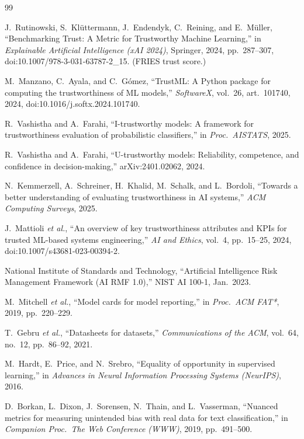 \renewcommand{\bibname}{References}
\begin{thebibliography}{99}
\small\setlength{\itemsep}{0pt}\setlength{\parskip}{0pt}

 J.~Rutinowski, S.~Kl\"uttermann, J.~Endendyk, C.~Reining, and E.~M\"uller, ``Benchmarking Trust: A Metric for Trustworthy Machine Learning,'' in \emph{Explainable Artificial Intelligence (xAI 2024)}, Springer, 2024, pp.~287--307, doi:10.1007/978-3-031-63787-2\_15. (FRIES trust score.)

 M.~Manzano, C.~Ayala, and C.~G\'omez, ``TrustML: A Python package for computing the trustworthiness of ML models,'' \emph{SoftwareX}, vol.~26, art.~101740, 2024, doi:10.1016/j.softx.2024.101740.

 R.~Vashistha and A.~Farahi, ``I-trustworthy models: A framework for trustworthiness evaluation of probabilistic classifiers,'' in \emph{Proc.\ AISTATS}, 2025.

 R.~Vashistha and A.~Farahi, ``U-trustworthy models: Reliability, competence, and confidence in decision-making,'' arXiv:2401.02062, 2024.

 N.~Kemmerzell, A.~Schreiner, H.~Khalid, M.~Schalk, and L.~Bordoli, ``Towards a better understanding of evaluating trustworthiness in AI systems,'' \emph{ACM Computing Surveys}, 2025.

 J.~Mattioli \emph{et al.}, ``An overview of key trustworthiness attributes and KPIs for trusted ML-based systems engineering,'' \emph{AI and Ethics}, vol.~4, pp.~15--25, 2024, doi:10.1007/s43681-023-00394-2.

 National Institute of Standards and Technology, ``Artificial Intelligence Risk Management Framework (AI RMF 1.0),'' NIST AI 100-1, Jan.\ 2023.

 M.~Mitchell \emph{et al.}, ``Model cards for model reporting,'' in \emph{Proc.\ ACM FAT*}, 2019, pp.~220--229.

 T.~Gebru \emph{et al.}, ``Datasheets for datasets,'' \emph{Communications of the ACM}, vol.~64, no.~12, pp.~86--92, 2021.

 M.~Hardt, E.~Price, and N.~Srebro, ``Equality of opportunity in supervised learning,'' in \emph{Advances in Neural Information Processing Systems (NeurIPS)}, 2016.

 D.~Borkan, L.~Dixon, J.~Sorensen, N.~Thain, and L.~Vasserman, ``Nuanced metrics for measuring unintended bias with real data for text classification,'' in \emph{Companion Proc.\ The Web Conference (WWW)}, 2019, pp.~491--500.


\end{thebibliography}
